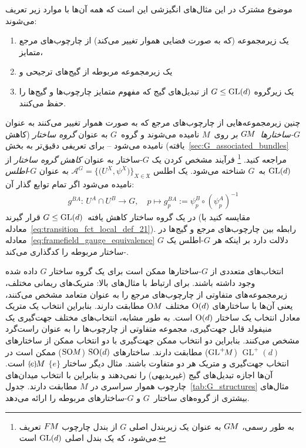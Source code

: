 \begin{samepage}
	موضوع مشترک در این مثال‌های انگیزشی این است که همه آن‌ها با موارد زیر تعریف می‌شوند:
	\begin{enumerate}
		\item یک زیرمجموعه (که به صورت فضایی هموار تغییر می‌کند) از چارچوب‌های مرجع متمایز،
		\item یک زیرمجموعه مربوطه از گیج‌های ترجیحی و
		\item یک زیرگروه $G \leq \operatorname{GL}(d)$ از تبدیل‌های گیج که مفهوم متمایز چارچوب‌ها و گیج‌ها را حفظ می‌کنند.
	\end{enumerate}
\end{samepage}
چنین زیرمجموعه‌هایی از چارچوب‌های مرجع که به صورت هموار تغییر می‌کنند به عنوان \emph{$G$-ساختارها}~$G\mkern-1.4muM$ بر روی~$M$ نامیده می‌شوند
و گروه~$G$ به عنوان \emph{گروه ساختار} (کاهش یافته) نامیده می‌شود
-- برای تعریفی دقیق‌تر به بخش~\ref{sec:G_associated_bundles} مراجعه کنید.%
\footnote{
	به طور رسمی، $G\mkern-1.4muM$ به عنوان یک زیربندل اصلی $G$ از بندل چارچوب $F\mkern-1.5muM$ تعریف می‌شود، که یک بندل اصلی $\operatorname{GL}(d)$ است.
}
فرآیند مشخص کردن یک $G$-ساختار به عنوان \emph{کاهش گروه ساختار} از $\operatorname{GL}(d)$ به~$G$ شناخته می‌شود.
یک اطلس ${\mathscr{A}^G = \big\{\! \big(U^X, \psi^X\big) \!\big\}_{X\in \mathfrak{X}}}$ به عنوان $G$-\emph{اطلس} نامیده می‌شود اگر تمام توابع گذار آن:
\begin{align}\label{eq:transition_fct_local_def_21_G_atlas}
	g^{BA}\!:\, U^A\cap U^B\to G, \quad p \mapsto g_p^{BA} := \psi_p^B \circ \left(\psi_p^A\right)^{-1}
\end{align}
در یک گروه ساختار کاهش یافته~$G \leq \operatorname{GL}(d)$ قرار گیرند (مقایسه کنید با معادله~\eqref{eq:transition_fct_local_def_21}).
رابطه بین چارچوب‌های مرجع و گیج‌ها در معادله~\eqref{eq:framefield_gauge_equivalence} دلالت دارد بر اینکه هر $G$-اطلس یک $G$-ساختار مربوطه را کدگذاری می‌کند.


انتخاب‌های متعددی از $G$-ساختارها ممکن است برای یک گروه ساختار $G$ داده شده وجود داشته باشند.
برای ارتباط با مثال‌های بالا:
متریک‌های ریمانی مختلف، زیرمجموعه‌های متفاوتی از چارچوب‌های مرجع را به عنوان متعامد مشخص می‌کنند، یعنی آن‌ها با ساختارهای $\operatorname{O}(d)$ مختلف $\operatorname{O}\mkern-3.6muM$ مطابقت دارند.
بنابراین انتخاب یک متریک معادل انتخاب یک ساختار $\operatorname{O}(d)$ است.
به طور مشابه، انتخاب‌های مختلف جهت‌گیری یک منیفولد قابل جهت‌گیری، مجموعه متفاوتی از چارچوب‌ها را به عنوان راست‌گرد مشخص می‌کنند.
بنابراین دو انتخاب ممکن جهت‌گیری با دو انتخاب ممکن از ساختارهای $\operatorname{GL}^+(d)$ ($\operatorname{GL}^+\mkern-5muM$) مطابقت دارند.
ساختارهای $\operatorname{SO}(d)$ ($\operatorname{SO}\mkern-3.6muM$) ممکن است در انتخاب جهت‌گیری و متریک هر دو متفاوت باشند.
مثال دیگر ساختار $\{e\}$ $\eM$ است.
آن‌ها اجازه تبدیل‌های گیج (غیربدیهی) را نمی‌دهند و بنابراین با انتخاب میدان‌های چارچوب هموار سراسری در $M$ مطابقت دارند.
جدول~\ref{tab:G_structures} مثال‌های بیشتری از گروه‌های ساختار~$G$ و $G$-ساختارهای مربوطه را ارائه می‌دهد.


